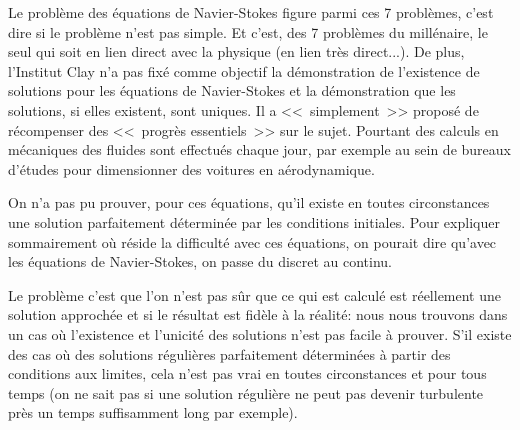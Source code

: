 \begin{histoire}
\medskip
Le problème des équations de Navier-Stokes
 figure parmi ces 7 problèmes, c'est dire
si le problème n'est pas simple. Et c'est, des 7 problèmes du millénaire, le seul
qui soit en lien direct avec la physique (en lien très direct...).
De plus, l'Institut Clay n'a pas fixé comme objectif la démonstration de l'existence
de solutions pour les équations de Navier-Stokes et la démonstration que les solutions,
si elles existent, sont uniques. Il a <<~simplement~>> proposé de récompenser des
<<~progrès essentiels~>> sur le sujet.
Pourtant des calculs en mécaniques des fluides sont effectués chaque jour, par exemple
au sein de bureaux d'études pour dimensionner des voitures en aérodynamique.

On n'a pas pu prouver, pour ces équations, qu'il existe en toutes circonstances une
solution parfaitement déterminée par les conditions initiales. 
Pour expliquer sommairement où réside la difficulté avec ces équations,
on pourait dire qu'avec les équations de Navier-Stokes, on passe du discret au continu.

\medskip
Le problème c'est que l'on n'est pas sûr que ce qui est calculé est réellement une
solution approchée et si le résultat est fidèle à la réalité: nous nous trouvons dans
un cas où l'existence et l'unicité des solutions n'est pas facile à prouver.
S'il existe des cas où des solutions régulières parfaitement déterminées à partir des
conditions aux limites, cela n'est pas vrai en toutes circonstances et pour tous temps (on
ne sait pas si une solution régulière ne peut pas devenir turbulente près un temps
suffisamment long par exemple).


\end{histoire}
